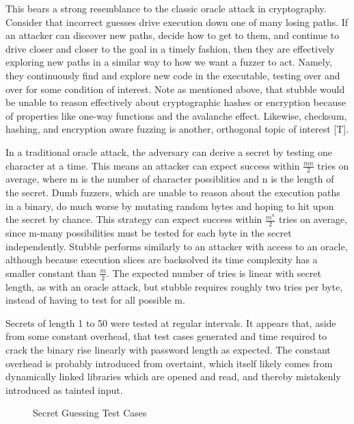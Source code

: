 \documentclass[11pt,expanded,copyright]{fsuthesis}
\begin{document}
This bears a strong resemblance to the classic oracle attack in cryptography. Consider that incorrect guesses drive execution down one of many losing paths. If an attacker can discover new paths, decide how to get to them, and continue to drive closer and closer to the goal in a timely fashion, then they are effectively exploring new paths in a similar way to how we want a fuzzer to act. Namely, they continuously find and explore new code in the executable, testing over and over for some condition of interest. Note as mentioned above, that stubble would be unable to reason effectively about cryptographic hashes or encryption because of properties like one-way functions and the avalanche effect. Likewise, checksum, hashing, and encryption aware fuzzing is another, orthogonal topic of interest [T].

In a traditional oracle attack, the adversary can derive a secret by testing one character at a time. This means an attacker can expect success within $\frac{mn}{2}$ tries on average, where m is the number of character possiblities and n is the length of the secret. Dumb fuzzers, which are unable to reason about the execution paths in a binary, do much worse by mutating random bytes and hoping to hit upon the secret by chance. This strategy can expect success within $\frac{m^n}{2}$ tries on average, since m-many possibilities must be tested for each byte in the secret independently. Stubble performs similarly to an attacker with access to an oracle, although because execution slices are backsolved its time complexity has a smaller constant than $\frac{m}{2}$. The expected number of tries is linear with secret length, as with an oracle attack, but stubble requires roughly two tries per byte, instead of having to test for all possible m.

Secrets of length 1 to 50 were tested at regular intervals. It appears that, aside from some constant overhead, that test cases generated and time required to crack the binary rise linearly with password length as expected. The constant overhead is probably introduced from overtaint, which itself likely comes from dynamically linked libraries which are opened and read, and thereby mistakenly introduced as tainted input.

\begin{figure}
\caption{Secret Guessing Test Cases}

\end{figure}
\end{document}
